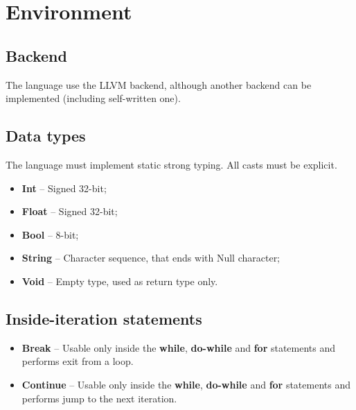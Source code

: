 \documentclass{article}
\begin{document}
	\section{Environment}
		\upshape
		
		\subsection{Backend}
			The language use the LLVM backend, although another backend can be implemented
			(including self-written one).

		\subsection{Data types}
			The language must implement static strong typing. All casts must
			be explicit.
			\begin{itemize}
				\item \textbf{Int} -- Signed 32-bit;
				\item \textbf{Float} -- Signed 32-bit;
				\item \textbf{Bool} -- 8-bit;
				\item \textbf{String} -- Character sequence, that ends with Null character;
				\item \textbf{Void} -- Empty type, used as return type only.
			\end{itemize}
			
		\subsection{Inside-iteration statements}
			\begin{itemize}
				\item \textbf{Break} -- Usable only inside the \textbf{while},
		  			\textbf{do-while} and \textbf{for} statements and performs exit from a
			  		loop.
				
				\item \textbf{Continue} -- Usable only inside the \textbf{while},
		  			\textbf{do-while} and \textbf{for} statements and performs jump to
		  			the next iteration.
			\end{itemize}
			
\end{document}
